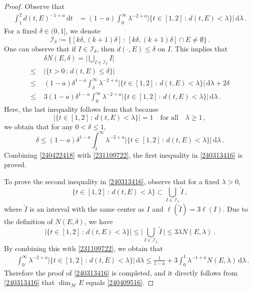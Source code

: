 \documentclass[11pt]{amsart}
\theoremstyle{plain}
\theoremstyle{definition}
\theoremstyle{remark}
\numberwithin{equation}{section}
\newcommand{\cI}{\mathcal{I}}
\newcommand{\cM}{\mathcal{M}}
\newcommand{\dd}{\,\mathrm{d}}
\begin{document}
    
\begin{proof}
Observe that
\begin{align}\label{231109722}
    \int_1^2d(t,E)^{-1+a}\dd t&=(1-a) \int_0^\infty \lambda^{-2+a}\big|\{t\in[1,2]\,:\,d(t,E)<\lambda\}\big|\dd \lambda\,.
\end{align}
For a fixed $\delta\in(0,1]$, we denote 
$$
\cI_\delta:=\big\{[k\delta,(k+1)\delta]\,:\,[k\delta,(k+1)\delta]\cap E\neq \emptyset\big\}\,.
$$
One can observe that if $I\in\cI_\delta$, then $d(\cdot,E)\leq \delta$ on $I$.
This implies that
\begin{align}\label{240422418}
&\delta N(E,\delta)=\bigg|\bigcup_{I\in \cI_\delta}I\bigg| \nonumber\\
\leq \,\,&\big|\{t>0\,:\,d(t,E)\leq \delta\}\big|\\
\leq \,\,&
(1-a)\delta^{1-a}\int_\delta^\infty \lambda^{-2+a}\big|\{t\in [1,2]\,:\,d(t,E)<\lambda\}\big|\dd \lambda+2\delta\nonumber\\
\leq \,\,&3(1-a)\delta^{1-a}\int_0^\infty \lambda^{-2+a}\big|\{t\in [1,2]\,:\,d(t,E)<\lambda\}\big|\dd \lambda\,.\nonumber
\end{align}
Here, the last inequality follows from that because 
$$
|\{t\in [1,2]\,:\,d(t,E)<\lambda\}|=1\quad \text{for all}\quad \lambda\geq 1\,,
$$
we obtain that for any $0<\delta\leq 1$,
$$
\delta\leq (1-a)\delta^{1-a} \int_1^\infty \lambda^{-2+a}|\{t\in [1,2]\,:\,d(t,E)<\lambda\}|\dd \lambda\,.
$$
Combining \eqref{240422418} with \eqref{231109722}, the first inequality in \eqref{240313416} is proved.

To prove the second inequality in \eqref{240313416}, 
observe that for a fixed $\lambda>0$,
$$
\big\{t\in[1,2]\,:\,d(t,E)<\lambda\big\}\subset \bigcup_{I\in\cI_\lambda}\widetilde{I}\,,
$$
where $\widetilde{I}$ is an interval with the same center as $I$ and $\ell(\widetilde{I})=3\ell(I)$.
Due to the definition of $N(E,\delta)$, we have
$$
\big|\big\{t\in[1,2]\,:\,d(t,E)<\lambda\big\}\big|\leq \bigg|\bigcup_{I\in \cI_\lambda}\widetilde{I}\,\bigg|\leq 3\lambda N(E,\lambda)\,.
$$
By combining this with \eqref{231109722}, we obtain that
\begin{align*}
&\int_0^\infty \lambda^{-2+a}|\{t\in[1,2]\,:\,d(t,E)<\lambda\}|\dd \lambda\leq \frac{1}{1-a}+3\int_0^1\lambda^{-1+a}N(E,\lambda)\dd \lambda\,.
\end{align*}
Therefore the proof of \eqref{240313416} is completed, and
it directly follows from \eqref{240313416} that $\dim_\cM E$ equals \eqref{240409516}.
\end{proof}
\end{document}
